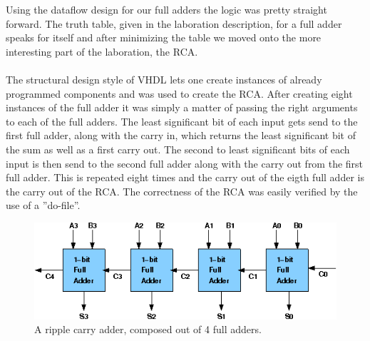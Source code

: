 \documentclass[a4paper,11pt]{article}
\begin{document}
\noindent
Using the dataflow design for our full adders the logic was pretty straight 
forward. The truth table, given in the laboration description, for a full 
adder speaks for itself and after minimizing the table we moved onto the more 
interesting part of the laboration, the RCA.\\\\
\noindent
The structural design style of VHDL lets one create instances of already 
programmed components and was used to create the RCA. After creating eight 
instances of the full adder it was simply a matter of passing the right 
arguments to each of the full adders. The least significant bit of each input 
gets send to the first full adder, along with the carry in, which returns the 
least significant bit of the sum as well as a first carry out. The second to 
least significant bits of each input is then send to the second full adder 
along with the carry out from the first full adder. This is repeated eight 
times and the carry out of the eigth full adder is the carry out of the RCA. 
The correctness of the RCA was easily verified by the use of a ''do-file''.

\begin{figure}[h]
    \centering
    \includegraphics[width=\linewidth]{RCA.png}
    \caption{A ripple carry adder, composed out of 4 full adders.}
    \label{RCA}
\end{figure}
\end{document}

